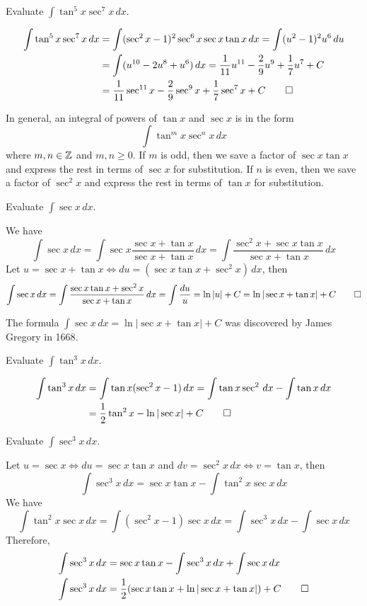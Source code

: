 \begin{problem}
    Evaluate \(\displaystyle{\int\tan^5 x\sec^7 x\,dx}\).
\end{problem}
\begin{solution}
    \begin{align*}
        \int\tan^5 x\sec^7 x\,dx
        &= \int(\sec^2 x-1)^2\sec^6 x\sec x\tan x\,dx
        =\int(u^2-1)^2u^6\,du \\
        &= \int(u^{10}-2u^8+u^6)\,dx
        =\frac{1}{11}u^{11}-\frac{2}{9}u^9+\frac{1}{7}u^7+C \\
        &= \frac{1}{11}\sec^{11}x-\frac{2}{9}\sec^9 x+\frac{1}{7}\sec^7 x
        +C \qedhere
    \end{align*}
\end{solution}
In general, an integral of powers of \(\tan x\) and \(\sec x\) is in the
form
\[\int\tan^m x\sec^n x\,dx\]
where \(m,n\in\mathbb{Z}\) and \(m,n\geq 0\).
If \(m\) is odd, then we save a factor of \(\sec x\tan x\) and express the
rest in terms of \(\sec x\) for substitution.
If \(n\) is even, then we save a factor of \(\sec^2 x\) and express the
rest in terms of \(\tan x\) for substitution.
\begin{problem}
    Evaluate \(\displaystyle{\int\sec x\,dx}\).
\end{problem}
\begin{solution}
    We have
    \[\int\sec x\,dx=\int\sec x\frac{\sec x+\tan x}{\sec x+\tan x}\,dx
    =\int\frac{\sec^2 x+\sec x\tan x}{\sec x+\tan x}\,dx\]
    Let \(u=\sec x+\tan x\iff du=(\sec x\tan x+\sec^2 x)\,dx\), then
    \[\int\sec x\,dx=\int\frac{\sec x\tan x+\sec^2 x}{\sec x+\tan x}\,dx
    =\int\frac{du}{u}=\ln|u|+C=\ln|\sec x+\tan x|+C\qedhere\]
\end{solution}
The formula \(\displaystyle{\int\sec x\,dx=\ln|\sec x+\tan x|+C}\) was
discovered by James Gregory in 1668.
\begin{problem}
    Evaluate \(\displaystyle{\int\tan^3 x\,dx}\).
\end{problem}
\begin{solution}
    \begin{align*}
    \int\tan^3 x\,dx &= \int\tan x(\sec^2x-1)\,dx
    =\int\tan x\sec^2\,dx-\int\tan x\,dx \\
    &= \frac{1}{2}\tan^2 x-\ln|\sec x|+C \qedhere
    \end{align*}
\end{solution}
\begin{problem}
    Evaluate \(\displaystyle{\int\sec^3 x\,dx}\).
\end{problem}
\begin{solution}
    Let \(u=\sec x\iff du=\sec x\tan x\) and \(dv=\sec^2 x\,dx\iff v=\tan x\),
    then
    \[\int\sec^3 x\,dx=\sec x\tan x-\int\tan^2 x\sec x\,dx\]
    We have
    \[\int\tan^2 x\sec x\,dx=\int(\sec^2 x-1)\sec x\,dx
    =\int\sec^3 x\,dx-\int\sec x\,dx\]
    Therefore,
    \begin{align*}
        \int\sec^3 x\,dx &= \sec x\tan x-\int\sec^3 x\,dx+\int\sec x\,dx \\
        \int\sec^3 x\,dx
        &= \frac{1}{2}(\sec x\tan x+\ln|\sec x+\tan x|)+C \qedhere
    \end{align*}
\end{solution}

